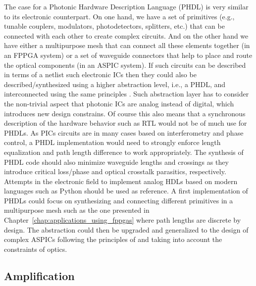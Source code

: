 The case for a Photonic Hardware Description Language (PHDL) is very similar to its electronic counterpart.
On one hand, we have a set of primitives (e.g., tunable couplers, modulators, photodetectors, splitters, etc.) that can be connected with each other to create complex circuits.
And on the other hand we have either a multipurpose mesh that can connect all these elements together (in an FPPGA system) or a set of waveguide connectors that help to place and route the optical components (in an ASPIC system).
If such circuits can be described in terms of a netlist such electronic ICs then they could also be described/synthesized using a higher abstraction level, i.e., a PHDL, and interconnected using the same principles \cite{lee_algorithm_1961}.
Such abstraction layer has to consider the non-trivial aspect that photonic ICs are analog instead of digital, which introduces new design constrains.
Of course this also means that a synchronous description of the hardware behavior such as RTL would not be of much use for PHDLs.
As PICs circuits are in many cases based on interferometry and phase control, a PHDL implementation would need to strongly enforce length equalization and path length difference to work appropriately.
The synthesis of PHDL code should also minimize waveguide lengths and crossings as they introduce critical loss/phase and optical crosstalk parasitics, respectively.
Attempts in the electronic field to implement analog HDLs based on modern languages such as Python \cite{fritchman_integrated_2023} should be used as reference.
A first implementation of PHDLs could focus on synthesizing and connecting different primitives in a multipurpose mesh such as the one presented in Chapter~\ref{chap:applications_using_fppgas} where path lengths are discrete by design.
The abstraction could then be upgraded and generalized to the design of complex ASPICs following the principles of \cite{lee_algorithm_1961} and taking into account the constraints of optics.

\subsection{Amplification}\label{sub:amplification} %

